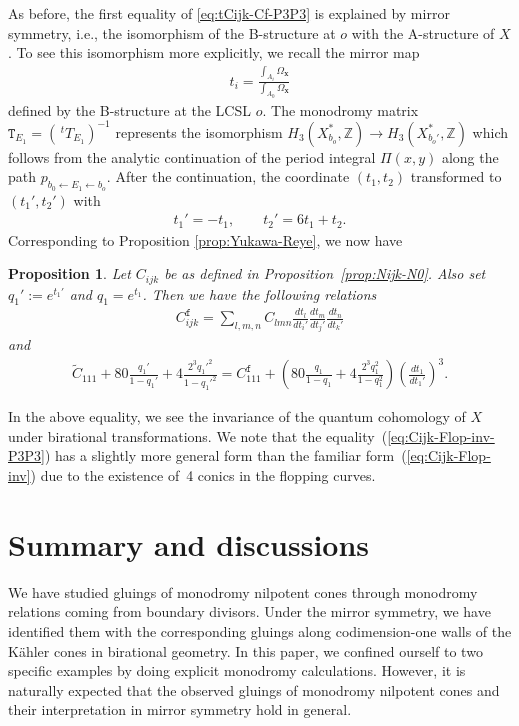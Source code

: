 \documentclass[pdftex]{sigma}
\numberwithin{equation}{section}
\newtheorem{Proposition}[Theorem]{Proposition}
\begin{document}
As before, the first equality of \eqref{eq:tCijk-Cf-P3P3} is explained by mirror symmetry, i.e., the isomorphism of the B-structure at $o$ with the A-structure of $X$. To see this isomorphism more explicitly, we recall the mirror map
\begin{gather*}
t_{i}=\frac{\int_{A_{i}}\Omega_{\bm{x}}}{\int_{A_{0}}\Omega_{\bm{x}}}
\end{gather*}
defined by the B-structure at the LCSL $o$. The monodromy matrix $\mathtt{T}_{E_{1}}=(\,^{t}T_{E_{1}})^{-1}$ represents the isomorphism $H_{3}(X_{b_{o}}^{*},\mathbb{Z})\to H_{3}(X_{b_{o}'}^{*},\mathbb{Z})$ which follows from the analytic continuation of the period integral $\Pi(x,y)$ along the path $p_{b_{0}\leftarrow E_{1}\leftarrow b_{o}}$. After the continuation, the coordinate $(t_{1},t_{2})$ transformed to $(t_{1}',t_{2}')$ with
\begin{gather*}
t_{1}'=-t_{1},\qquad t_{2}'=6t_{1}+t_{2}.
\end{gather*}
 Corresponding to Proposition \ref{prop:Yukawa-Reye}, we now have
\begin{Proposition}Let $C_{ijk}$ be as defined in Proposition~{\rm \ref{prop:Nijk-N0}}. Also set $q_{1}':=e^{t_{1}'}$ and $q_{1}=e^{t_{1}}$. Then we have the following relations
\begin{gather*}
C_{ijk}^{\mathtt{f}}=\sum_{l,m,n}C_{lmn}\frac{dt_{l}}{dt_{i}'}\frac{dt_{m}}{dt_{j}'}\frac{dt_{n}}{dt_{k}'}
\end{gather*}
and
\begin{gather}
\tilde{C}_{111}+80\frac{q_{1}'}{1-q_{1}'}+4\frac{2^{3}q_{1}'^{2}}{1-q_{1}'^{2}}=C_{111}^{\mathtt{f}}+\left(80\frac{q_{1}}{1-q_{1}}+4\frac{2^{3}q_{1}^{2}}{1-q_{1}^{2}}\right)\left(\frac{dt_{1}}{dt_{1}'}\right)^{3}.\label{eq:Cijk-Flop-inv-P3P3}
\end{gather}
\end{Proposition}

In the above equality, we see the invariance of the quantum cohomology of $X$ under birational transformations. We note that the equality~(\ref{eq:Cijk-Flop-inv-P3P3}) has a slightly more general form than the familiar form~(\ref{eq:Cijk-Flop-inv}) due to the existence of~4 conics in the flopping curves.

\section{Summary and discussions}\label{section6}

We have studied gluings of monodromy nilpotent cones through monodromy relations coming from boundary divisors. Under the mirror symmetry, we have identified them with the corresponding gluings along codimension-one walls of the K\"ahler cones in birational geometry. In this paper, we confined ourself to two specific examples by doing explicit monodromy calculations. However, it is naturally expected that the observed gluings of monodromy nilpotent cones and their interpretation in mirror symmetry hold in general.
\end{document}
